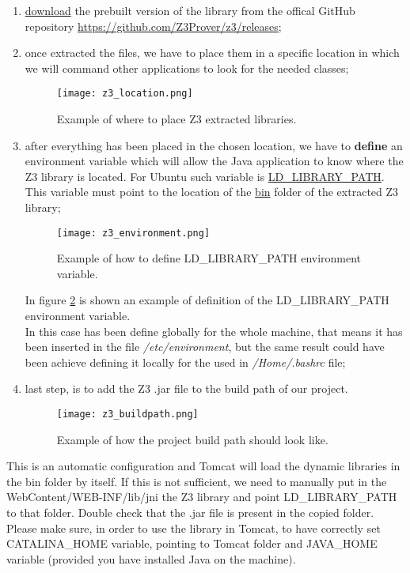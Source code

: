 \begin{enumerate}
	\item \underline{download} the prebuilt version of the library from the offical GitHub repository \url{https://github.com/Z3Prover/z3/releases};
	\item once extracted the files, we have to place them in a specific location in which we will command other applications to look for the needed classes;
	\begin{figure}[!htb]
		\centering
		\texttt{[image: z3\_location.png]}
		\caption{Example of where to place Z3 extracted libraries.}\label{Fig:Z3Location}
	\end{figure}
	\item after everything has been placed in the chosen location, we have to \textbf{define} an environment variable which will allow the Java application to know where the Z3 library is located. For Ubuntu such variable is \underline{LD\_LIBRARY\_PATH}. This variable must point to the location of the \underline{bin} folder of the extracted Z3 library;
	\begin{figure}[!htb]
		\centering
		\texttt{[image: z3\_environment.png]}
		\caption{Example of how to define LD\_LIBRARY\_PATH environment variable.}\label{Fig:Z3Environment}
	\end{figure}
	In figure \ref{Fig:Z3Environment} is shown an example of definition of the LD\_LIBRARY\_PATH environment variable. \\
	In this case has been define globally for the whole machine, that means it has been inserted in the file \textit{/etc/environment}, but the same result could have been achieve defining it locally for the used in \textit{/Home/.bashrc} file;
	\item last step, is to add the Z3 .jar file to the build path of our project.
	\begin{figure}[!htb]
		\centering
		\texttt{[image: z3\_buildpath.png]}
		\caption{Example of how the project build path should look like.}\label{Fig:Z3BuildPath}
	\end{figure}
\end{enumerate}
This is an automatic configuration and Tomcat will load the dynamic libraries in the bin folder by itself. If this is not sufficient, we need to manually put in the WebContent/WEB-INF/lib/jni the Z3 library and point LD\_LIBRARY\_PATH to that folder. Double check that the .jar file is present in the copied folder.\\
Please make sure, in order to use the library in Tomcat, to have correctly set CATALINA\_HOME variable, pointing to Tomcat folder and JAVA\_HOME variable (provided you have installed Java on the machine).

